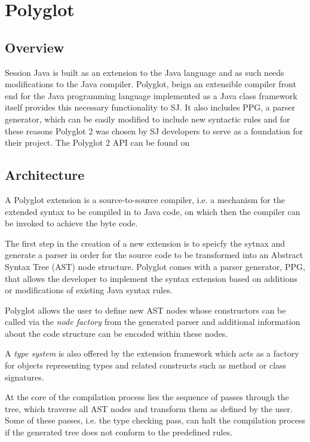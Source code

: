 \section{Polyglot}
\label{sec:polyglot}

\subsection{Overview}
\label{subsec:polyglotoverview}
Session Java is built as an extension to the Java language and as such needs modifications to the Java compiler. Polyglot, beign an extensible compiler front end for the Java programming language implemented as a Java class framework \cite{polyglotonline} itself provides this necessary functionality to SJ. It also includes PPG, a parser generator, which can be easily modified to include new syntactic rules and for these reasons Polyglot 2 was chosen by SJ developers to serve as a foundation for their project. The Polyglot 2 API can be found on \cite{polyglotapi}

\subsection{Architecture}
\label{subsec:polyglotarch}
A Polyglot extension is a source-to-source compiler, i.e. a mechanism for the extended syntax to be compiled in to Java code, on which then the  compiler can be invoked to achieve the byte code. 

The first step in the creation of a new extension is to speicfy the sytnax and generate a parser in order for the source code to be transformed into an Abstract Syntax Tree (AST) node structure. Polyglot comes with a parser generator, PPG, that allows the developer to implement the syntax extension based on additions or modifications of existing Java syntax rules\cite{polyglotpaper}.

Polyglot allows the user to define new AST nodes whose constructors can be called via the \textit{node factory} from the generated parser and additional information about the code structure can be encoded within these nodes. 

A \textit{type system} is also offered by the extension framework which acts as a factory for objects representing types and related constructs such as method or class signatures\cite{polyglotpaper}.

At the core of the compilation process lies the sequence of passes through the tree, which traverse all AST nodes and transform them as defined by the user. Some of these passes, i.e. the type checking pass, can halt the compilation process if the generated tree does not conform to the predefined rules. 

